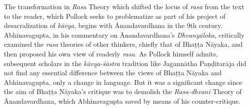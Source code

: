 The transformation in \textsl{Rasa} Theory which shifted the locus of \textsl{rasa} from the text to the reader, which Pollock seeks to problematize as part of his project of desacralization of \textsl{kāvya}, begins with Ānandavardhana in the 9th century. Abhinavagupta, in his commentary on Ānandavardhana's \textsl{Dhvanyāloka}, critically examined the \textsl{rasa} theories of other thinkers, chiefly that of Bhaṭṭa Nāyaka, and then proposed his own view of readerly \textsl{rasa}. As Pollock himself admits, subsequent scholars in the \textsl{kāvya-śāstra} tradition like Jagannātha Paṇḍitarāja did not find any essential difference between the views of Bhaṭṭa Nāyaka and Abhinavagupta, only a change in language. But it was a significant change since the aim of Bhaṭṭa Nāyaka's critique was to demolish the \textsl{Rasa-dhvani} Theory of Ānandavardhana, which Abhinavagupta saved by means of his counter-critique. 

